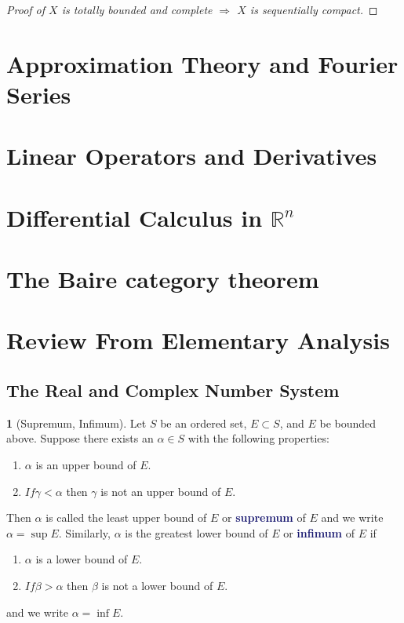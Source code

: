 \documentclass[12pt]{article}
\numberwithin{equation}{section}
\newcommand{\navy}[1]{\textcolor{MidnightBlue}{\bf #1}}
\theoremstyle{plain}
\theoremstyle{definition}
\newtheorem{definition}{\color{MidnightBlue}{\textbf{Definition}}}[section]
\def\imp{\Rightarrow}
\newcommand{\1}{\mathbbm 1}
\newcommand{\RR}{\mathbb R}
\begin{document}
\begin{proof}[Proof of $X$ is totally bounded and complete $\imp$ $X$ is sequentially compact]
\end{proof}



\newpage



\section{Approximation Theory and Fourier Series}

\section{Linear Operators and Derivatives}

\section[Differential Calculus in Rn]{Differential Calculus in $\RR^n$}

\section{The Baire category theorem}

\appendix

\section{Review From Elementary Analysis}

\subsection{The Real and Complex Number System}

\begin{definition}[Supremum, Infimum]
	Let $S$ be an ordered set, $E \subset S$, and $E$ be bounded above. Suppose there exists an $\alpha \in S$ with the following properties:
	\begin{enumerate}
		\item $\alpha$ is an upper bound of $E$.
		\item $If \gamma < \alpha$ then $\gamma$ is not an upper bound of $E$.
	\end{enumerate}
	Then $\alpha$ is called the least upper bound of $E$ or \navy{supremum} of $E$ and we write $\alpha = \sup E$. Similarly, $\alpha$ is the greatest lower bound of $E$ or \navy{infimum} of $E$ if 
	\begin{enumerate}
		\item $\alpha$ is a lower bound of $E$.
		\item $If \beta > \alpha$ then $\beta$ is not a lower bound of $E$.
	\end{enumerate}
	and we write $\alpha = \inf E$.
\end{definition}
\end{document}
